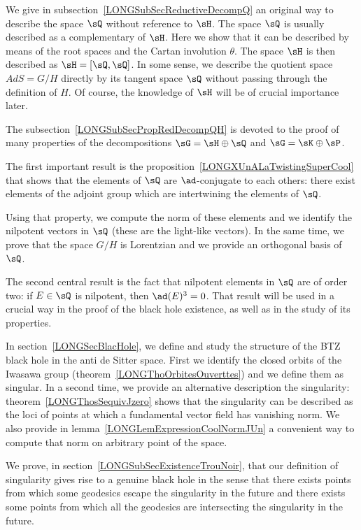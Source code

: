 We give in subsection~\ref{LONGSubSecReductiveDecompQ} an original way to describe the space $\sQ$ without reference to $\sH$. The space $\sQ$ is usually described as a complementary of $\sH$. Here we show that it can be described by means of the root spaces and the Cartan involution $\theta$. The space $\sH$ is then described as $\sH=[\sQ,\sQ]$. In some sense, we describe the quotient space $AdS=G/H$ directly by its tangent space $\sQ$ without passing through the definition of $H$. Of course, the knowledge of $\sH$ will be of crucial importance later.


The subsection~\ref{LONGSubSecPropRedDecompQH} is devoted to the proof of many properties of the decompositions $\sG=\sH\oplus\sQ$ and $\sG=\sK\oplus\sP$.


The first important result is the proposition~\ref{LONGXUnALaTwistingSuperCool} that shows that the elements of $\sQ$ are $\ad$-conjugate to each others: there exist elements of the adjoint group which are intertwining the elements of $\sQ$.

Using that property, we compute the norm of these elements and we identify the nilpotent vectors in $\sQ$ (these are the light-like vectors). In the same time, we prove that the space $G/H$ is Lorentzian and we provide an orthogonal basis of $\sQ$.

The second central result is the fact that nilpotent elements in $\sQ$ are of order two: if $E\in\sQ$ is nilpotent, then $\ad(E)^3=0$. That result will be used in a crucial way in the proof of the black hole existence, as well as in the study of its properties.

In section~\ref{LONGSecBlacHole}, we define and study the structure of the BTZ black hole in the anti de Sitter space. First we identify the closed orbits of the Iwasawa group (theorem~\ref{LONGThoOrbitesOuverttes}) and we define them as singular. In a second time, we provide an alternative description the singularity: theorem~\ref{LONGThosSequivJzero} shows that the singularity can be described as the loci of points at which a fundamental vector field has vanishing norm. We also provide in lemma~\ref{LONGLemExpressionCoolNormJUn} a convenient way to compute that norm on arbitrary point of the space.

We prove, in section~\ref{LONGSubSecExistenceTrouNoir}, that our definition of singularity gives rise to a genuine black hole in the sense that there exists points from which some geodesics escape the singularity in the future and there exists some points from which all the geodesics are intersecting the singularity in the future.

